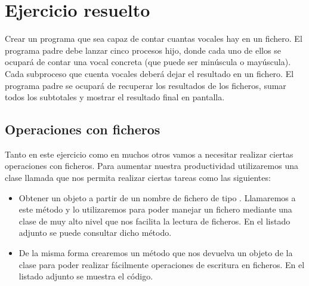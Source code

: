 \documentclass[letterpaper,10pt,spanish]{sphinxmanual}
\begin{document}
\section{Ejercicio resuelto}
\label{\detokenize{textos/tema1:ejercicio-resuelto}}
Crear un programa que sea capaz de contar cuantas vocales hay en un fichero. El programa padre debe lanzar cinco procesos hijo, donde cada uno de ellos se ocupará de contar una vocal concreta (que puede ser minúscula o mayúscula). Cada subproceso que cuenta vocales deberá dejar el resultado en un fichero. El programa padre se ocupará de recuperar los resultados de los ficheros, sumar todos los subtotales y mostrar el resultado final en pantalla.


\subsection{Operaciones con ficheros}
\label{\detokenize{textos/tema1:operaciones-con-ficheros}}
Tanto en este ejercicio como en muchos otros vamos a necesitar realizar ciertas operaciones con ficheros. Para aumentar nuestra productividad utilizaremos una clase llamada  que nos permita realizar ciertas tareas como las siguientes:
\begin{itemize}
\item {} 
Obtener un objeto  a partir de un nombre de fichero de tipo . Llamaremos a este método  y lo utilizaremos para poder manejar un fichero mediante una clase de muy alto nivel que nos facilita la lectura de ficheros. En el listado adjunto se puede consultar dicho método.

\end{itemize}

\begin{sphinxVerbatim}[commandchars=\\\{\}]
   
      
 
     
       
     
       
     
\end{sphinxVerbatim}
\begin{itemize}
\item {} 
De la misma forma crearemos un método  que nos devuelva un objeto de la clase  para poder realizar fácilmente operaciones de escritura en ficheros. En el listado adjunto se muestra el código.

\end{itemize}
\end{document}

